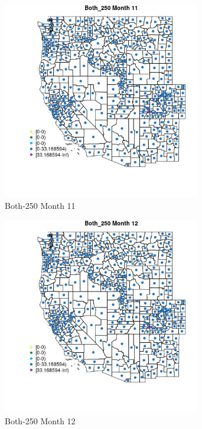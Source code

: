 \begin{figure} 
\centering  
\includegraphics[width=0.77\textwidth]{Code_Outputs/df_report_ML_predictors_CountyCentroid_Locations_Dates_2008-01-01to2018-12-31_MapObsMo11Both_250.jpg} 
\caption{\label{fig:df_report_ML_predictors_CountyCentroid_Locations_Dates_2008-01-01to2018-12-31MapObsMo11Both_250}Both-250 Month 11} 
\end{figure} 
 

\clearpage 

\begin{figure} 
\centering  
\includegraphics[width=0.77\textwidth]{Code_Outputs/df_report_ML_predictors_CountyCentroid_Locations_Dates_2008-01-01to2018-12-31_MapObsMo12Both_250.jpg} 
\caption{\label{fig:df_report_ML_predictors_CountyCentroid_Locations_Dates_2008-01-01to2018-12-31MapObsMo12Both_250}Both-250 Month 12} 
\end{figure} 
 

